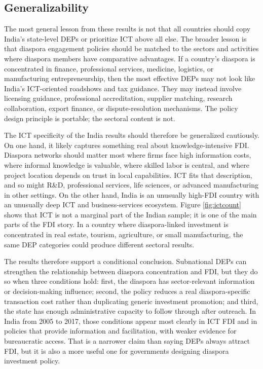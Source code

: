 \documentclass[12pt]{article}
\let\oldsubsection\subsection
\renewcommand{\subsection}{\FloatBarrier\oldsubsection}
\begin{document}
\subsection{Generalizability}

The most general lesson from these results is not that all countries should copy India's state-level DEPs or prioritize ICT above all else. The broader lesson is that diaspora engagement policies should be matched to the sectors and activities where diaspora members have comparative advantages. If a country's diaspora is concentrated in finance, professional services, medicine, logistics, or manufacturing entrepreneurship, then the most effective DEPs may not look like India's ICT-oriented roadshows and tax guidance. They may instead involve licensing guidance, professional accreditation, supplier matching, research collaboration, export finance, or dispute-resolution mechanisms. The policy design principle is portable; the sectoral content is not.

The ICT specificity of the India results should therefore be generalized cautiously. On one hand, it likely captures something real about knowledge-intensive FDI. Diaspora networks should matter most where firms face high information costs, where informal knowledge is valuable, where skilled labor is central, and where project location depends on trust in local capabilities. ICT fits that description, and so might R\&D, professional services, life sciences, or advanced manufacturing in other settings. On the other hand, India is an unusually high-FDI country with an unusually deep ICT and business-services ecosystem. Figure \ref{fig:ictcount} shows that ICT is not a marginal part of the Indian sample; it is one of the main parts of the FDI story. In a country where diaspora-linked investment is concentrated in real estate, tourism, agriculture, or small manufacturing, the same DEP categories could produce different sectoral results.

The results therefore support a conditional conclusion. Subnational DEPs can strengthen the relationship between diaspora concentration and FDI, but they do so when three conditions hold: first, the diaspora has sector-relevant information or decision-making influence; second, the policy reduces a real diaspora-specific transaction cost rather than duplicating generic investment promotion; and third, the state has enough administrative capacity to follow through after outreach. In India from 2005 to 2017, those conditions appear most clearly in ICT FDI and in policies that provide information and facilitation, with weaker evidence for bureaucratic access. That is a narrower claim than saying DEPs always attract FDI, but it is also a more useful one for governments designing diaspora investment policy.
\end{document}
